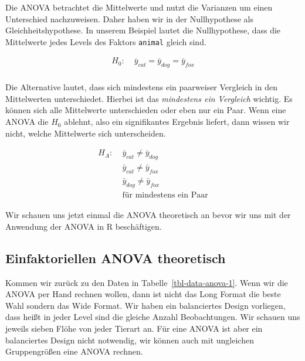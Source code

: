 \documentclass[
  letterpaper,
]{scrbook}
\begin{document}
Die ANOVA betrachtet die Mittelwerte und nutzt die Varianzen um einen
Unterschied nachzuweisen. Daher haben wir in der Nullhypothese als
Gleichheitshypothese. In unserem Beispiel lautet die Nullhypothese, dass
die Mittelwerte jedes Levels des Faktors \texttt{animal} gleich sind.

\[
\begin{align*}
H_0: &\; \bar{y}_{cat} = \bar{y}_{dog} = \bar{y}_{fox}\\
\end{align*}
\]

Die Alternative lautet, dass sich mindestens ein paarweiser Vergleich in
den Mittelwerten unterschiedet. Hierbei ist das \emph{mindestens ein
Vergleich} wichtig. Es können sich alle Mittelwerte unterschieden oder
eben nur ein Paar. Wenn eine ANOVA die \(H_0\) ablehnt, also ein
signifikantes Ergebnis liefert, dann wissen wir nicht, welche
Mittelwerte sich unterscheiden.

\[
\begin{align*}
H_A: &\; \bar{y}_{cat} \ne \bar{y}_{dog}\\
\phantom{H_A:} &\; \bar{y}_{cat} \ne \bar{y}_{fox}\\
\phantom{H_A:} &\; \bar{y}_{dog} \ne \bar{y}_{fox}\\
\phantom{H_A:} &\; \mbox{für mindestens ein Paar}
\end{align*}
\]

Wir schauen uns jetzt einmal die ANOVA theoretisch an bevor wir uns mit
der Anwendung der ANOVA in R beschäftigen.

\hypertarget{einfaktoriellen-anova-theoretisch}{%
\subsection{Einfaktoriellen ANOVA
theoretisch}\label{einfaktoriellen-anova-theoretisch}}

Kommen wir zurück zu den Daten in Tabelle~\ref{tbl-data-anova-1}. Wenn
wir die ANOVA per Hand rechnen wollen, dann ist nicht das Long Format
die beste Wahl sondern das Wide Format. Wir haben ein balanciertes
Design vorliegen, dass heißt in jeder Level sind die gleiche Anzahl
Beobachtungen. Wir schauen uns jeweils sieben Flöhe von jeder Tierart
an. Für eine ANOVA ist aber ein balanciertes Design nicht notwendig, wir
können auch mit ungleichen Gruppengrößen eine ANOVA rechnen.

{}
\end{document}
